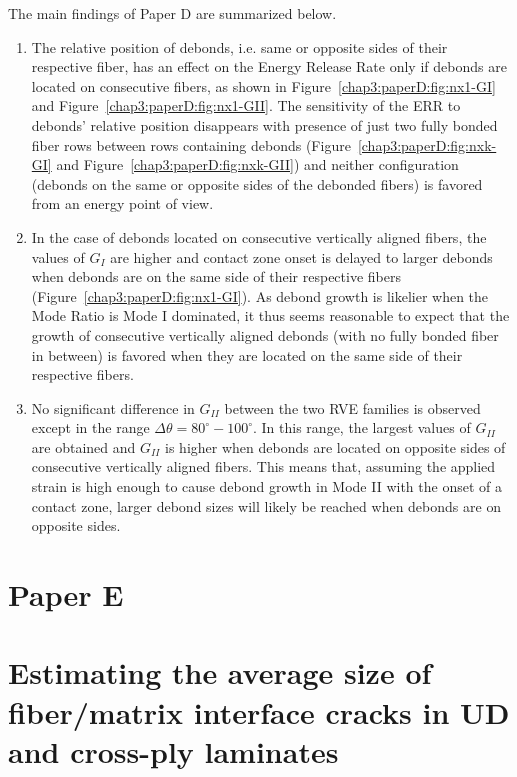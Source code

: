 The main findings of Paper D are summarized below.

\begin{enumerate}
\item The relative position of debonds, i.e. same or opposite sides of their respective fiber, has an effect on the Energy Release Rate only if debonds are located on consecutive fibers, as shown in Figure~\ref{chap3:paperD:fig:nx1-GI} and Figure~\ref{chap3:paperD:fig:nx1-GII}. The sensitivity of the ERR to debonds' relative position disappears with presence of just two fully bonded fiber rows between rows containing debonds (Figure~\ref{chap3:paperD:fig:nxk-GI} and Figure~\ref{chap3:paperD:fig:nxk-GII}) and neither configuration (debonds on the same or opposite sides of the debonded fibers) is favored from an energy point of view.
\item In the case of debonds located on consecutive vertically aligned fibers, the values of $G_{I}$ are higher and contact zone onset is delayed to larger debonds when debonds are on the same side of their respective fibers (Figure~\ref{chap3:paperD:fig:nx1-GI}). As debond growth is likelier when the Mode Ratio is Mode I dominated, it thus seems reasonable to expect that the growth of consecutive vertically aligned debonds (with no fully bonded fiber in between) is favored when they are located on the same side of their respective fibers.
\item No significant difference in $G_{II}$ between the two RVE families is observed except in the range $\Delta\theta=80^{\circ}-100^{\circ}$. In this range, the largest values of $G_{II}$ are obtained and $G_{II}$ is higher when debonds are located on opposite sides of consecutive vertically aligned fibers. This means that, assuming the applied strain is high enough to cause debond growth in Mode II with the onset of a contact zone, larger debond sizes will likely be reached when debonds are on opposite sides.
\end{enumerate}

\section{Paper E}\label{chap3:paperE}
\section*{Estimating the average size of fiber/matrix interface cracks in UD and cross-ply laminates}

